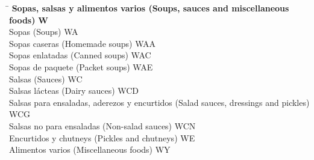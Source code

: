 \begin{small}
    \vspace{-1.25cm}
    
    \begin{tabbing}
    \hspace{15cm} \= \hspace{0cm} \kill
        \textbf{Sopas, salsas y alimentos varios (Soups, sauces and miscellaneous foods)} \> \textbf{W} \\
            \hspace{0.5cm}Sopas (Soups) \> WA \\
                \hspace{1cm}Sopas caseras (Homemade soups) \> WAA \\
                \hspace{1cm}Sopas enlatadas (Canned soups) \> WAC \\
                \hspace{1cm}Sopas de paquete (Packet soups) \> WAE \\
            \hspace{0.5cm}Salsas (Sauces) \> WC \\
                \hspace{1cm}Salsas lácteas (Dairy sauces) \> WCD \\
                \hspace{1cm}Salsas para ensaladas, aderezos y encurtidos (Salad sauces, dressings and pickles) \> WCG \\
                \hspace{1cm}Salsas no para ensaladas (Non-salad sauces) \> WCN \\
            \hspace{0.5cm}Encurtidos y chutneys (Pickles and chutneys) \> WE \\
            \hspace{0.5cm}Alimentos varios (Miscellaneous foods) \> WY \\
    \end{tabbing}
\end{small}